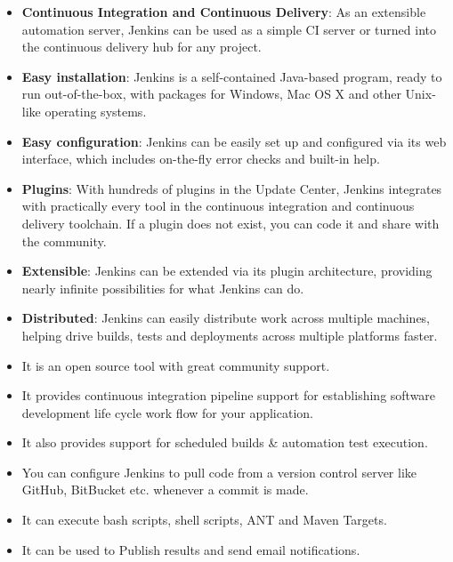 \begin{itemize}
	\item \textbf{Continuous Integration and Continuous Delivery}: As an extensible automation server, Jenkins can be used as a simple CI server or turned into the continuous delivery hub for any project.
	\item \textbf{Easy installation}: Jenkins is a self-contained Java-based program, ready to run out-of-the-box, with packages for Windows, Mac OS X and other Unix-like operating systems.
	\item \textbf{Easy configuration}: Jenkins can be easily set up and configured via its web interface, which includes on-the-fly error checks and built-in help.
	\item \textbf{Plugins}: With hundreds of plugins in the Update Center, Jenkins integrates with practically every tool in the continuous integration and continuous delivery toolchain. If a plugin does not exist, you can code it and share with the community.
	\item \textbf{Extensible}: Jenkins can be extended via its plugin architecture, providing nearly infinite possibilities for what Jenkins can do.
	\item \textbf{Distributed}: Jenkins can easily distribute work across multiple machines, helping drive builds, tests and deployments across multiple platforms faster.
	\item It is an open source tool with great community support.
	\item It provides continuous integration pipeline support for establishing software development life cycle work flow for your application.
	\item It also provides support for scheduled builds \& automation test execution.
	\item You can configure Jenkins to pull code from a version control server like GitHub, BitBucket etc. whenever a commit is made.
	\item It can execute bash scripts, shell scripts, ANT and Maven Targets.
	\item It can be used to Publish results and send email notifications.
\end{itemize}



\endinput